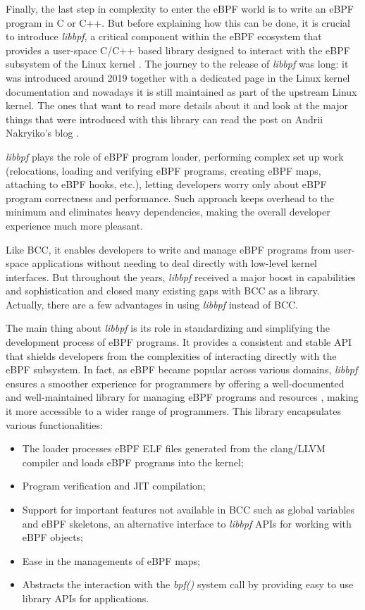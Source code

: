 Finally, the last step in complexity to enter the eBPF world is to write an eBPF program in C or C++.
But before explaining how this can be done, it is crucial to introduce \textit{libbpf},
a critical component within the eBPF ecosystem that provides a user-space C/C++ based library designed to interact with the eBPF subsystem of the Linux kernel \cite{libbpfRepo}. 
The journey to the release of \textit{libbpf} was long: it was introduced around 2019 together with a dedicated page in the Linux kernel documentation \cite{libbpfPageLinuxKernelDOc} and nowadays it is still maintained as part of the upstream Linux kernel.
The ones that want to read more details about it and look at the major things that were introduced with this library can read the post on Andrii Nakryiko's blog \cite{libbpfJourney}.

\textit{libbpf} plays the role of eBPF program loader, performing complex set up work (relocations, loading and verifying eBPF programs, creating eBPF maps, attaching to eBPF hooks, etc.), letting developers worry only about eBPF program correctness and performance. 
Such approach keeps overhead to the minimum and eliminates heavy dependencies, making the overall developer experience much more pleasant.

Like BCC, it enables developers to write and manage eBPF programs from user-space applications without needing to deal directly with low-level kernel interfaces.
But throughout the years, \textit{libbpf} received a major boost in capabilities and sophistication and closed many existing gaps with BCC as a library.
Actually, there are a few advantages in using \textit{libbpf} instead of BCC.

The main thing about \textit{libbpf} is its role in standardizing and simplifying the development process of eBPF programs. 
It provides a consistent and stable API that shields developers from the complexities of interacting directly with the eBPF subsystem. 
In fact, as eBPF became popular across various domains, \textit{libbpf} ensures a smoother experience for programmers by offering a well-documented and well-maintained library for managing eBPF programs and resources \cite{libbpfDocumentation}, making it more accessible to a wider range of programmers.
This library encapsulates various functionalities:

\begin{itemize}
	\item The loader processes eBPF ELF files generated from the 
		clang/LLVM compiler and loads eBPF programs into the kernel;
	\item Program verification and JIT compilation;
	\item Support for important features not available in BCC such as global 
		variables and eBPF skeletons, an alternative interface to \textit{libbpf} APIs for working with eBPF objects;
	\item Ease in the managements of eBPF maps;
	\item Abstracts the interaction with the \textit{bpf()} system call by providing 
		easy to use library APIs for applications.
\end{itemize}

